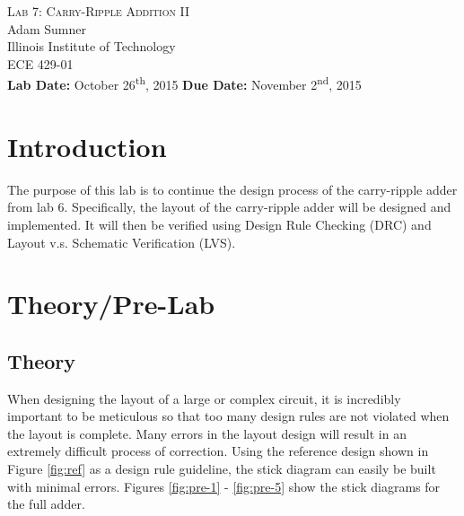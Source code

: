 \documentclass[12pt]{article}
\begin{document}
\begin{titlepage}
	\begin{center}
		
		
		\vfill
		
		\textsc{\LARGE Lab 7: Carry-Ripple Addition II}\\[1.5cm]
		
		\Large Adam Sumner\\[0.5cm]
		
		\Large Illinois Institute of Technology\\[0.5cm]
		
		\Large ECE 429-01\\[0.5cm]	
		
		\noindent
		\vfill
		\large \textbf{Lab Date:} October 26\textsuperscript{th}, 2015\hfill
		\large \textbf{Due Date:} November 2\textsuperscript{nd}, 2015
	
		
	\end{center}
\end{titlepage}

\section{Introduction}
The purpose of this lab is to continue the design process of the carry-ripple adder from lab 6. Specifically, the layout of the carry-ripple adder will be designed and implemented. It will then be verified using Design Rule Checking (DRC) and Layout v.s. Schematic Verification (LVS).
\section{Theory/Pre-Lab}
\subsection{Theory}
When designing the layout of a large or complex circuit, it is incredibly important to be meticulous so that too many design rules are not violated when the layout is complete. Many errors in the layout design will result in an extremely difficult process of correction. Using the reference design shown in Figure \ref{fig:ref} as a design rule guideline, the stick diagram can easily be built with minimal errors. Figures \ref{fig:pre-1} - \ref{fig:pre-5} show the stick diagrams for the full adder.
\end{document}
